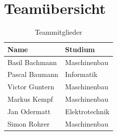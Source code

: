 \documentclass[a4paper]{report}
\begin{document}
\section{Teamübersicht}
\label{sec:Teamuebersicht}
\begin{table}[h!]
	\centering
	\begin{tabular}{|p{}|p{}|}
		\hline
		\textbf{Name} & \textbf{Studium} \\
		\hline
		Basil Bachmann & Maschinenbau \\
		\hline
		Pascal Baumann & Informatik \\
		\hline
		Victor Guntern & Maschinenbau \\
		\hline
		Markus Kempf & Maschinenbau \\
		\hline
		Jan Odermatt & Elektrotechnik \\
		\hline
		Simon Rohrer & Maschinenbau \\
		\hline
	\end{tabular}
	\caption{Teammitglieder}
	\label{tab:TeamMitglieder}
\end{table}

\newpage
\end{document}
